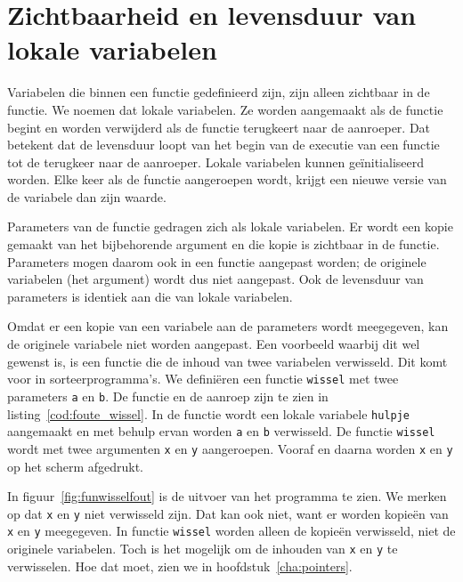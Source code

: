 \section{Zichtbaarheid en levensduur van lokale variabelen}
Variabelen die binnen een functie gedefinieerd zijn, zijn alleen zichtbaar in de functie. We noemen dat lokale variabelen. Ze worden aangemaakt als de functie begint en worden verwijderd als de functie terugkeert naar de aanroeper. Dat betekent dat de levensduur loopt van het begin van de executie van een functie tot de terugkeer naar de aanroeper. Lokale variabelen kunnen geïnitialiseerd worden. Elke keer als de functie aangeroepen wordt, krijgt een nieuwe versie van de variabele dan zijn waarde.

Parameters van de functie gedragen zich als lokale variabelen. Er wordt een kopie gemaakt van het bijbehorende argument en die kopie is zichtbaar in de functie. Parameters mogen daarom ook in een functie aangepast worden; de originele variabelen (het argument) wordt dus niet aangepast. Ook de levensduur van parameters is identiek aan die van lokale variabelen.

Omdat er een kopie van een variabele aan de parameters wordt meegegeven, kan de originele variabele niet worden aangepast. Een voorbeeld waarbij dit wel gewenst is, is een functie die de inhoud van twee variabelen verwisseld. Dit komt voor in sorteerprogramma's. We definiëren een functie \texttt{wissel} met twee parameters \texttt{a} en \texttt{b}. De functie en de aanroep zijn te zien in listing~\ref{cod:foute_wissel}. In de functie wordt een lokale variabele \texttt{hulpje} aangemaakt en met behulp ervan worden \texttt{a} en \texttt{b} verwisseld. De functie \texttt{wissel} wordt met twee argumenten \texttt{x} en \texttt{y} aangeroepen. Vooraf en daarna worden \texttt{x} en \texttt{y} op het scherm afgedrukt.


In figuur~\ref{fig:funwisselfout} is de uitvoer van het programma te zien. We merken op dat \texttt{x} en \texttt{y} niet verwisseld zijn. Dat kan ook niet, want er worden kopieën van \texttt{x} en \texttt{y} meegegeven. In functie \texttt{wissel} worden alleen de kopieën verwisseld, niet de originele variabelen.
Toch is het mogelijk om de inhouden van \texttt{x} en \texttt{y} te verwisselen. Hoe dat moet, zien we in hoofdstuk~\ref{cha:pointers}.

